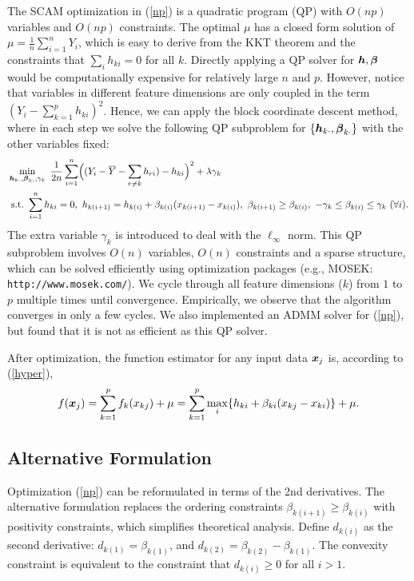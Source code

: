 The SCAM optimization in (\ref{np}) is a quadratic program (QP) with $O(np)$ variables and $O(np)$ constraints. The optimal $\mu$ has a closed form solution of $\mu = \frac{1}{n}\sum_{i=1}^n Y_i$, which is easy to derive from the KKT theorem and the constraints that $\sum_i h_{ki} = 0$ for all $k$.
Directly applying a QP solver for $\boldsymbol{h}, \boldsymbol{\beta}$ would be computationally expensive for relatively large $n$ and $p$. However, notice that variables
in different feature dimensions are only coupled in the term $(Y_{i}-\sum_{k=1}^{p}h_{ki})^{2}$. Hence, we can apply the block coordinate descent method,
where in each step we solve the following QP subproblem for
$\{\boldsymbol{h}_{k\cdot},\boldsymbol{\beta}_{k\cdot}\}$ with the other variables fixed:
\begin{equation}\begin{split}\nonumber
       &\min_{\bds{h}_{k\cdot},\bds{\beta}_{k\cdot},\gamma_{k}} 
             \ \frac{1}{2n}\sum_{i=1}^{n}\Bigl((Y_{i}-\bar{Y}-\sum_{r\neq{k}}h_{ri})-h_{ki}\Bigr)^{2} 
                      + \lambda\gamma_{k} \\
        &\ \textrm{s.t.} \ \sum_{i=1}^{n}h_{ki}=0, \ h_{k(i+1)} = h_{k(i)} + \beta_{k(i)}(x_{k(i+1)}-x_{k(i)}), \ \beta_{k(i+1)} \geq \beta_{k(i)}, \ -\gamma_{k}\leq\beta_{k(i)}\leq\gamma_{k} \ (\forall i).
\end{split}\end{equation}
The extra variable $\gamma_{k}$ is introduced to deal with the $\ell_{\infty}$ norm. This QP subproblem involves $O(n)$ variables, $O(n)$ constraints and a sparse structure, 
which can be solved efficiently using optimization packages (e.g., MOSEK: \verb+http://www.mosek.com/+).  We cycle through all feature dimensions ($k$) from $1$ to $p$ multiple times until convergence.
Empirically, we observe that the algorithm converges in only a few cycles. We also implemented an ADMM solver for (\ref{np}), but found that it is not as efficient as this QP solver.

After optimization, the function estimator for any input data $\boldsymbol{x}_j$ is, according to (\ref{hyper}),
\begin{equation}\nonumber
      f(\boldsymbol{x}_j) = \sum_{k=1}^{p}f_k(x_{kj})+\mu = \sum_{k=1}^{p}\max_{i} \{h_{ki}+\beta_{ki}(x_{kj}-x_{ki})\} + \mu.
\end{equation} 


\subsection{Alternative Formulation}
Optimization (\ref{np}) can be reformulated in terms of the 2nd derivatives. The alternative formulation replaces the ordering
constraints $\beta_{k(i+1)} \geq \beta_{k(i)}$ with positivity
constraints, which simplifies theoretical analysis.
Define $d_{k(i)}$ as the second derivative:
$d_{k(1)} = \beta_{k(1)}$, and $d_{k(2)} =
\beta_{k(2)} - \beta_{k(1)}$. The convexity constraint is
equivalent to the constraint that $d_{k(i)} \geq 0$ for all $i >
1$.

